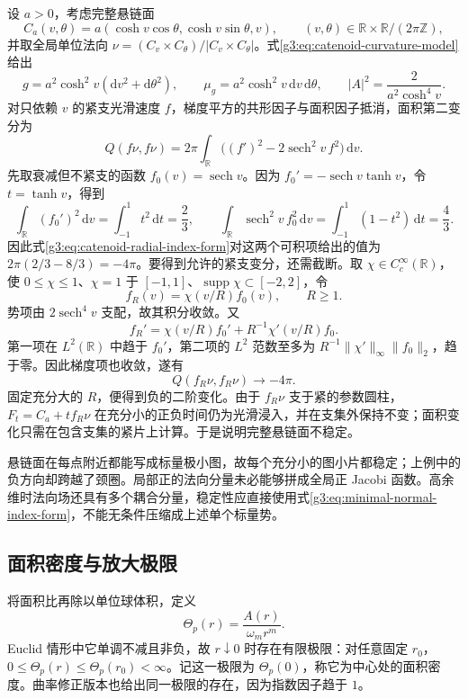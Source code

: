 \begin{example}\label{g3:exm:catenoid-compact-negative-direction}
	设 \(a>0\)，考虑完整悬链面
	\[
		C_a(v,\theta)=a(\cosh v\cos\theta,\cosh v\sin\theta,v),
		\qquad (v,\theta)\in\mathbb R\times\mathbb R/(2\pi\mathbb Z),
	\]
	并取全局单位法向 \(\nu=(C_v\times C_\theta)/|C_v\times C_\theta|\)。式\eqref{g3:eq:catenoid-curvature-model}给出
	\[
		g=a^2\cosh^2v(\mathrm dv^2+\mathrm d\theta^2),\qquad
		\mu_g=a^2\cosh^2v\,\mathrm dv\,\mathrm d\theta,
		\qquad |A|^2=\frac2{a^2\cosh^4v}.
	\]
	对只依赖 \(v\) 的紧支光滑速度 \(f\)，梯度平方的共形因子与面积因子抵消，面积第二变分为
	\begin{equation}\label{g3:eq:catenoid-radial-index-form}
		Q(f\nu,f\nu)=2\pi\int_{\mathbb R}
		\bigl((f')^2-2\operatorname{sech}^2v\,f^2\bigr)\,\mathrm dv.
	\end{equation}
	先取衰减但不紧支的函数 \(f_0(v)=\operatorname{sech}v\)。因为 \(f_0'=-\operatorname{sech}v\tanh v\)，令 \(t=\tanh v\)，得到
	\[
		\int_{\mathbb R}(f_0')^2\,\mathrm dv
		=\int_{-1}^1t^2\,\mathrm dt=\frac23,\qquad
		\int_{\mathbb R}\operatorname{sech}^2v\,f_0^2\,\mathrm dv
		=\int_{-1}^1(1-t^2)\,\mathrm dt=\frac43.
	\]
	因此式\eqref{g3:eq:catenoid-radial-index-form}对这两个可积项给出的值为 \(2\pi(2/3-8/3)=-4\pi\)。要得到允许的紧支变分，还需截断。取 \(\chi\in C_c^\infty(\mathbb R)\)，使 \(0\le\chi\le1\)、\(\chi=1\) 于 \([-1,1]\)、\(\operatorname{supp}\chi\subset[-2,2]\)，令
	\[
		f_R(v)=\chi(v/R)f_0(v),\qquad R\ge1.
	\]
	势项由 \(2\operatorname{sech}^4v\) 支配，故其积分收敛。又
	\[
		f_R'=\chi(v/R)f_0'+R^{-1}\chi'(v/R)f_0.
	\]
	第一项在 \(L^2(\mathbb R)\) 中趋于 \(f_0'\)，第二项的 \(L^2\) 范数至多为 \(R^{-1}\|\chi'\|_\infty\|f_0\|_2\)，趋于零。因此梯度项也收敛，遂有
	\[
		Q(f_R\nu,f_R\nu)\longrightarrow-4\pi.
	\]
	固定充分大的 \(R\)，便得到负的二阶变化。由于 \(f_R\nu\) 支于紧的参数圆柱，\(F_t=C_a+t f_R\nu\) 在充分小的正负时间仍为光滑浸入，并在支集外保持不变；面积变化只需在包含支集的紧片上计算。于是说明完整悬链面不稳定。
\end{example}

悬链面在每点附近都能写成标量极小图，故每个充分小的图小片都稳定；上例中的负方向却跨越了颈圈。局部正的法向分量未必能够拼成全局正 Jacobi 函数。高余维时法向场还具有多个耦合分量，稳定性应直接使用式\eqref{g3:eq:minimal-normal-index-form}，不能无条件压缩成上述单个标量势。

\subsection{面积密度与放大极限}
\label{g3:subsec:1903:04}
将面积比再除以单位球体积，定义
\[
	\Theta_p(r)=\frac{A(r)}{\omega_mr^m}.
\]
Euclid 情形中它单调不减且非负，故 \(r\downarrow0\) 时存在有限极限：对任意固定 \(r_0\)，\(0\le\Theta_p(r)\le\Theta_p(r_0)<\infty\)。记这一极限为 \(\Theta_p(0)\)，称它为中心处的面积密度。曲率修正版本也给出同一极限的存在，因为指数因子趋于 \(1\)。

